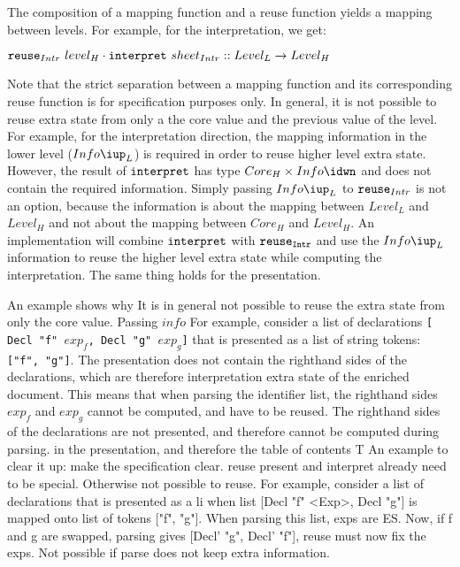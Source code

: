The composition of a mapping function and a reuse function yields a mapping between levels. For example, for the interpretation, we get:

\begin{small}\begin{math}
{\tt reuse}_{Intr}~level_{H} \cdot {\tt interpret}~sheet_{Intr} :: Level_{L} \rightarrow Level_{H}
\end{math}\end{small} 

Note that the strict separation between a mapping function and its corresponding reuse function is for specification purposes only. In general, it is not possible to reuse extra state from only a the core value and the previous value of the level. For example, for the interpretation direction, the mapping information in the lower level ($Info\iup_{L}$) is required in order to reuse higher level extra state. However, the result of ${\tt interpret}$ has type 
$Core_{H}\times Info\idwn$ and does not contain the required information. Simply passing $Info\iup_{L}$ to ${\tt reuse}_{Intr}$ is not an option, because the information is about the mapping between $Level_{L}$ and $Level_{H}$ and not about the mapping between $Core_{H}$ and $Level_{H}$. An implementation will combine ${\tt interpret}$ with ${\tt reuse_{Intr}}$ and use the $Info\iup_{L}$ information to reuse the higher level extra state while computing the interpretation. The same thing holds for the presentation.


\bc
 An example shows why It is in general not possible to reuse the extra state from only the core value. Passing $info$
For example, consider a list of declarations {\tt [ Decl "f" $exp_f$, Decl "g" $exp_g$]} that is presented as a list of string tokens: {\tt ["f", "g"]}. The presentation does not contain the righthand sides of the declarations, which are therefore interpretation extra state of the enriched document. This means that when parsing the identifier list, the righthand sides $exp_f$ and $exp_g$ cannot be computed, and have to be reused. 
The righthand sides of the declarations are not presented, and therefore cannot be computed during parsing. in the presentation, and therefore the table of contents T
An example to clear it up:
 make the specification clear. 
 reuse present and interpret already need to be special. Otherwise not possible to reuse. For example, consider a list of declarations that is presented as a li when list [Decl "f" <Exp>, Decl "g"] is mapped onto list of tokens ["f", "g"]. When parsing this list, exps are ES. Now, if f and g are swapped, parsing gives [Decl' "g", Decl' "f"],  reuse must now fix the exps. Not possible if parse does not keep extra information.
\ec

